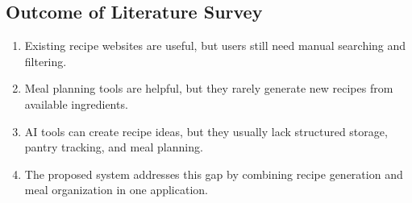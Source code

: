 \subsection{Outcome of Literature Survey}
\begin{enumerate}
\item Existing recipe websites are useful, but users still need manual searching and filtering.
\item Meal planning tools are helpful, but they rarely generate new recipes from available ingredients.
\item AI tools can create recipe ideas, but they usually lack structured storage, pantry tracking, and meal planning.
\item The proposed system addresses this gap by combining recipe generation and meal organization in one application.
\end{enumerate}
